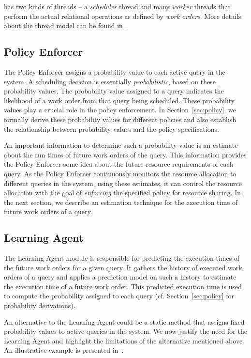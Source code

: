 \sys{} has two kinds of threads -- a \textit{scheduler} thread and many \textit{worker} threads that perform the actual relational operations as defined by \textit{work orders}. 
More details about the thread model can be found in~\cite{supplement}.

\subsection{Policy Enforcer}\label{ssec:policy-enforcer}
The Policy Enforcer assigns a probability value to each active query in the system. 
A scheduling decision is essentially \textit{probabilistic}, based on these probability values. 
The probability value assigned to a query indicates the likelihood of a work order from that query being scheduled. 
These probability values play a crucial role in the policy enforcement.
In Section~\ref{sec:policy}, we formally derive these probability values for different policies and also establish the relationship between probability values and the policy specifications.

An important information to determine such a probability value is an estimate about the run times of future work orders of the query.
This information provides the Policy Enforcer some idea about the future resource requirements of each query.
As the Policy Enforcer continuously monitors the resource allocation to different queries in the system, using these estimates, it can control the resource allocation with the goal of \textit{enforcing} the specified policy for resource sharing. 
In the next section, we describe an estimation technique for the execution time of future work orders of a query.
\subsection{Learning Agent}\label{ssec:learning}
The Learning Agent module is responsible for predicting the execution times of the future work orders for a given query. 
It gathers the history of executed work orders of a query and applies a prediction model on such a history to estimate the execution time of a future work order.
This predicted execution time is used to compute the probability assigned to each query (cf. Section~\ref{sec:policy} for probability derivations).

An alternative to the Learning Agent could be a static method that assigns fixed probability values to active queries in the system. 
We now justify the need for the Learning Agent and highlight the limitations of the alternative mentioned above.
An illustrative example is presented in~\cite{supplement}.

